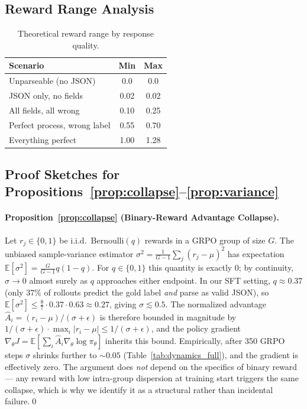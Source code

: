 \documentclass{article}
\begin{document}
\subsection{Reward Range Analysis}

\begin{table}[h]
\centering
\small
\caption{Theoretical reward range by response quality.}
\label{tab:reward_range}
\begin{tabular}{lcc}
\toprule
\textbf{Scenario} & \textbf{Min} & \textbf{Max} \\
\midrule
Unparseable (no JSON) & 0.0 & 0.0 \\
JSON only, no fields & 0.02 & 0.02 \\
All fields, all wrong & 0.10 & 0.25 \\
Perfect process, wrong label & 0.55 & 0.70 \\
Everything perfect & 1.00 & 1.28 \\
\bottomrule
\end{tabular}
\end{table}

\subsection{Proof Sketches for Propositions~\ref{prop:collapse}--\ref{prop:variance}}
\label{app:theory}

\paragraph{Proposition~\ref{prop:collapse} (Binary-Reward Advantage Collapse).}
Let $r_j \in \{0,1\}$ be i.i.d.\ Bernoulli$(q)$ rewards in a GRPO group of size $G$.
The unbiased sample-variance estimator $\sigma^2 = \frac{1}{G-1}\sum_j (r_j - \mu)^2$ has expectation $\mathbb{E}[\sigma^2] = \frac{G}{G-1} q(1-q)$.
For $q \in \{0, 1\}$ this quantity is exactly $0$; by continuity, $\sigma \to 0$ almost surely as $q$ approaches either endpoint.
In our SFT setting, $q \approx 0.37$ (only $37\%$ of rollouts predict the gold label \emph{and} parse as valid JSON), so $\mathbb{E}[\sigma^2] \leq \frac{8}{7}\cdot 0.37 \cdot 0.63 \approx 0.27$, giving $\sigma \lesssim 0.5$.
The normalized advantage $\hat{A}_i = (r_i - \mu)/(\sigma + \epsilon)$ is therefore bounded in magnitude by $1/(\sigma + \epsilon) \cdot \max_i |r_i - \mu| \leq 1/(\sigma + \epsilon)$, and the policy gradient $\nabla_\theta J = \mathbb{E}\!\left[\sum_i \hat{A}_i \nabla_\theta \log \pi_\theta\right]$ inherits this bound.
Empirically, after 350 GRPO steps $\sigma$ shrinks further to $\sim$$0.05$ (Table~\ref{tab:dynamics_full}), and the gradient is effectively zero.
The argument does \emph{not} depend on the specifics of binary reward --- any reward with low intra-group dispersion at training start triggers the same collapse, which is why we identify it as a structural rather than incidental failure.\qed
\end{document}
